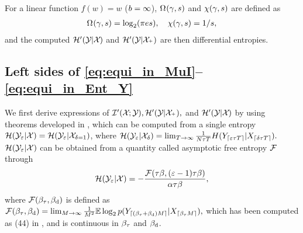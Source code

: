 \documentclass[12pt, draftclsnofoot,journal,onecolumn]{IEEEtran}
\begin{document}
For a linear function $f(w)=w$ ($b=\infty$), $\Enta[](\gainv,s)$ and $\chi(\gamma,s)$ are defined as
\begin{align}
    \Enta[](\gainv,s)=\log_2 (\pi es),\quad \chi(\gainv,s)= {1}/{s},
    \label{eq:linear_Ent_chi}
\end{align}
and the  computed ${\mathcal{H}{'}}({\mathcal{Y}}_{}|{\mathcal{X}}_{})$ and ${\mathcal{H}{'}}({\mathcal{Y}}_{}|{\mathcal{X}}_{^+})$ are then differential entropies. 




\subsection{Left sides of \eqref{eq:equi_in_MuI}--\eqref{eq:equi_in_Ent_Y}}
We first derive expressions of $\mathcal{I}{'}({\mathcal{X}}_{};{\mathcal{Y}}_{}), {\mathcal{H}{'}}({\mathcal{Y}}_{}|{\mathcal{X}}_{ ^+}),$ and ${\mathcal{H}{'}}({\mathcal{Y}}_{}|{\mathcal{X}}_{})$ by using theorems developed in \cite{gaopart1}, which can be computed from a single entropy $\mathcal{H}(\mathcal{Y}_{\varepsilon}|\mathcal{X})=\mathcal{H}(\mathcal{Y}_\varepsilon|\mathcal{X}_{\delta=1})$, where $\mathcal{H}(\mathcal{Y}_\varepsilon|\mathcal{X}_\delta)=\lim_{T\to\infty}\frac{1}{N{\tau T}}H(Y_{\lceil\varepsilon{\tau T}\rceil}|X_{\lceil\delta{\tau T}\rceil}).$
$\mathcal{H}(\mathcal{Y}_{\varepsilon}|\mathcal{X})$ can be obtained from a quantity called asymptotic free entropy $\mathcal{F}$ through
\begin{align}
    \mathcal{H}(\mathcal{Y}_\varepsilon|\mathcal{X}) = -\frac{\mathcal{F}(\tau\beta,(\varepsilon-1)\tau\beta)}{\alpha\tau\beta},
    \label{eq:Ent_Y_cond_X_tau}
\end{align}
where $\mathcal{F}(\beta_{\rm{\tau}},\beta_{\rm{d}})$ is defined as $\mathcal{F}(\beta_{\rm{\tau}},\beta_{\rm{d}}) = \lim_{M\to\infty}\frac{1}{M^2}\mathbb{E}\log_2 p(Y_{\lceil(\beta_{\rm{\tau}}+\beta_{\rm{d}})M\rceil}|X_{\lceil\beta_{\rm{\tau}}M\rceil}),$
 which has been computed as (44) in \cite{wen2016bayes}, and is continuous in $\beta_{\rm{\tau}}$ and $\beta_{\rm{d}}$.
\end{document}

